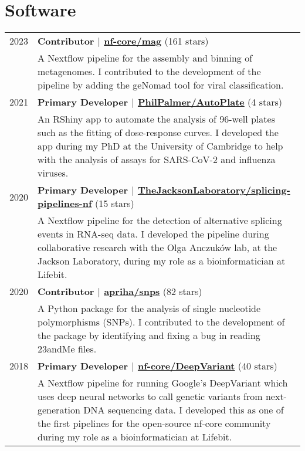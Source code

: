 \documentclass[letterpaper,11pt]{article}
\begin{document}
\section{\textbf{Software}}
\vspace{3pt}
\begin{tabularx}{\linewidth}{@{}p{2cm}@{\hspace{5pt}}|@{\hspace{5pt}}X@{}}
    2023 & 
    \textbf{Contributor $|$ \href{https://github.com/nf-core/mag}{\color{teal}nf-core/mag}} (161 stars) \\
    & A Nextflow pipeline for the assembly and binning of metagenomes. I contributed to the development of the pipeline by adding the geNomad tool for viral classification. \\
    2021 &
    \textbf{Primary Developer $|$ \href{https://github.com/PhilPalmer/AutoPlate}{\color{teal}PhilPalmer/AutoPlate}} (4 stars) \\
    & An RShiny app to automate the analysis of 96-well plates such as the fitting of dose-response curves. I developed the app during my PhD at the University of Cambridge to help with the analysis of assays for SARS-CoV-2 and influenza viruses. \\
    2020 &
    \textbf{Primary Developer $|$ \href{https://github.com/TheJacksonLaboratory/splicing-pipelines-nf}{\color{teal}TheJacksonLaboratory/splicing-pipelines-nf}} (15 stars) \\
    & A Nextflow pipeline for the detection of alternative splicing events in RNA-seq data. I developed the pipeline during collaborative research with the Olga Anczuków lab, at the Jackson Laboratory, during my role as a bioinformatician at Lifebit. \\
    2020 &
    \textbf{Contributor $|$ \href{https://github.com/apriha/snps}{\color{teal}apriha/snps}} (82 stars) \\
    & A Python package for the analysis of single nucleotide polymorphisms (SNPs). I contributed to the development of the package by identifying and fixing a bug in reading 23andMe files. \\
    2018 &
    \textbf{Primary Developer $|$ \href{https://github.com/nf-core/DeepVariant}{\color{teal}nf-core/DeepVariant}} (40 stars) \\
    & A Nextflow pipeline for running Google's DeepVariant which uses deep neural networks to call genetic variants from next-generation DNA sequencing data. I developed this as one of the first pipelines for the open-source nf-core community during my role as a bioinformatician at Lifebit. \\    
\end{tabularx}
\end{document}
